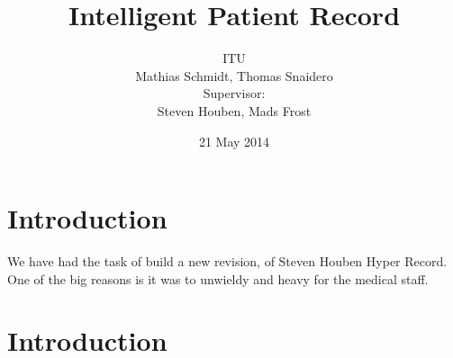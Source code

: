\documentclass{article}
\title{Intelligent Patient Record}
\author{ITU \\
Mathias Schmidt, Thomas Snaidero \\
Supervisor: \\
Steven Houben, Mads Frost}
\date{21 May 2014}
\begin{document}
\maketitle

\pagebreak

\tableofcontents

\pagebreak


\section{Introduction}
We have had the task of build a new revision, of Steven Houben Hyper Record.
One of the big reasons is it was to unwieldy and heavy for the medical staff.


\section{Introduction}













% 

% 

% 
\end{document}
